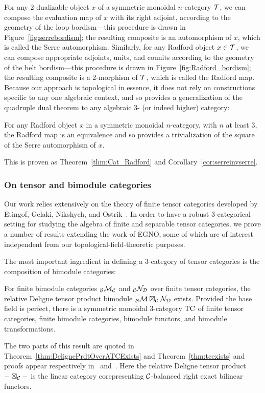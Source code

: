 \documentclass{amsart}
\begin{document}
For any 2-dualizable object $x$ of a symmetric monoidal $n$-category $\mathcal T$, we can compose the evaluation map of $x$ with its right adjoint, according to the geometry of the loop bordism---this procedure is drawn in Figure~\ref{fig:serrebordism}; the resulting composite is an automorphism of $x$, which is called the Serre automorphism.  Similarly, for any Radford object $x \in \mathcal T$, we can compose appropriate adjoints, units, and counits according to the geometry of the belt bordism---this procedure is drawn in Figure~\ref{fig:Radford_bordism}; the resulting composite is a 2-morphism of $\mathcal T$, which is called the Radford map.  Because our approach is topological in essence, it does not rely on constructions specific to any one algebraic context, and so provides a generalization of the quadruple dual theorem to any algebraic 3- (or indeed higher) category:
\begin{maintheorem} \label{thm8}
For any Radford object $x$ in a symmetric monoidal $n$-category, with $n$ at least 3, the Radford map is an equivalence and so provides a trivialization of the square of the Serre automorphism of $x$.
\end{maintheorem}
\nid This is proven as Theorem~\ref{thm:Cat_Radford} and Corollary~\ref{cor:serreinvserre}.


\subsubsection{On tensor and bimodule categories}

Our work relies extensively on the theory of finite tensor categories developed by Etingof, Gelaki, Nikshych, and Ostrik~\cite{EGNO, EO-ftc, MR2183279, MR2097289,0909.3140}.  In order to have a robust 3-categorical setting for studying the algebra of finite and separable tensor categories, we prove a number of results extending the work of EGNO, some of which are of interest independent from our topological-field-theoretic purposes.

The most important ingredient in defining a 3-category of tensor categories is the composition of bimodule categories:
\begin{maintheorem} \label{thm9}
For finite bimodule categories ${}_\mathcal B \mathcal M_\mathcal C$ and ${}_\mathcal C \mathcal N_\mathcal D$ over finite tensor categories, the relative Deligne tensor product bimodule ${}_\mathcal B \mathcal M \boxtimes_\mathcal C \mathcal N_\mathcal D$ exists.  Provided the base field is perfect, there is a symmetric monoidal 3-category $\mathrm{TC}$ of finite tensor categories, finite bimodule categories, bimodule functors, and bimodule transformations.
\end{maintheorem}
\nid The two parts of this result are quoted in Theorem~\ref{thm:DelignePrdtOverATCExists} and Theorem~\ref{thm:tcexists} and proofs appear respectively in~\cite{BTP} and~\cite{3TC}.  Here the relative Deligne tensor product $- \boxtimes_\mathcal C -$ is the linear category corepresenting $\mathcal C$-balanced right exact bilinear functors.  
\end{document}
